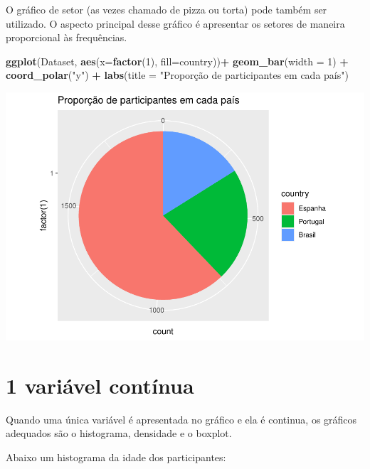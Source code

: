 \documentclass[
]{book}
\newenvironment{Shaded}{\begin{snugshade}}{\end{snugshade}}
\newcommand{\DataTypeTok}[1]{\textcolor[rgb]{0.13,0.29,0.53}{#1}}
\newcommand{\DecValTok}[1]{\textcolor[rgb]{0.00,0.00,0.81}{#1}}
\newcommand{\KeywordTok}[1]{\textcolor[rgb]{0.13,0.29,0.53}{\textbf{#1}}}
\newcommand{\NormalTok}[1]{#1}
\newcommand{\OperatorTok}[1]{\textcolor[rgb]{0.81,0.36,0.00}{\textbf{#1}}}
\newcommand{\StringTok}[1]{\textcolor[rgb]{0.31,0.60,0.02}{#1}}
\begin{document}
O gráfico de setor (as vezes chamado de pizza ou torta) pode também ser utilizado. O aspecto principal desse gráfico é apresentar os setores de maneira proporcional às frequências.

\begin{Shaded}
\begin{Highlighting}[]
\KeywordTok{ggplot}\NormalTok{(Dataset, }\KeywordTok{aes}\NormalTok{(}\DataTypeTok{x=}\KeywordTok{factor}\NormalTok{(}\DecValTok{1}\NormalTok{), }\DataTypeTok{fill=}\NormalTok{country))}\OperatorTok{+}
\StringTok{  }\KeywordTok{geom_bar}\NormalTok{(}\DataTypeTok{width =} \DecValTok{1}\NormalTok{) }\OperatorTok{+}
\StringTok{  }\KeywordTok{coord_polar}\NormalTok{(}\StringTok{"y"}\NormalTok{) }\OperatorTok{+}
\StringTok{  }\KeywordTok{labs}\NormalTok{(}\DataTypeTok{title =} \StringTok{"Proporção de participantes em cada país"}\NormalTok{)}
\end{Highlighting}
\end{Shaded}

\begin{center}\includegraphics{gitbook-demo_files/figure-latex/unnamed-chunk-15-1} \end{center}

\hypertarget{variuxe1vel-contuxednua}{%
\section{1 variável contínua}\label{variuxe1vel-contuxednua}}

Quando uma única variável é apresentada no gráfico e ela é continua, os gráficos adequados são o histograma, densidade e o boxplot.

Abaixo um histograma da idade dos participantes:
\end{document}
